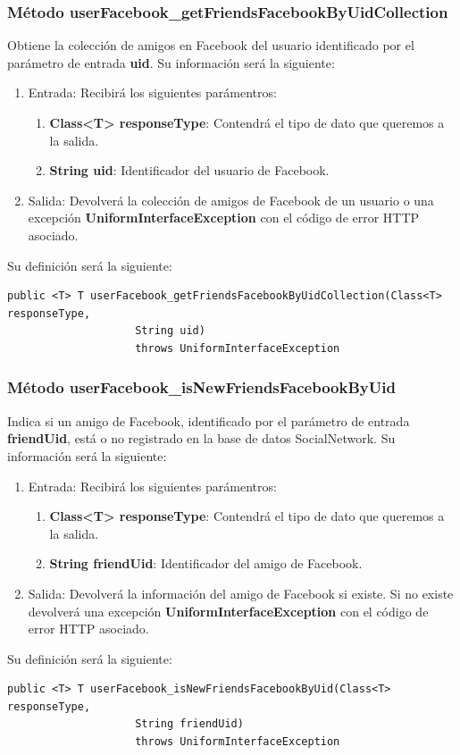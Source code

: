 \subsubsection{Método userFacebook\_getFriendsFacebookByUidCollection}
Obtiene la colección de amigos en Facebook del usuario identificado por el parámetro de entrada \textbf{uid}. Su información será la siguiente:
\begin{enumerate}
\item Entrada: Recibirá los siguientes parámentros:
\begin{enumerate}
\item \textbf{Class<T> responseType}: Contendrá el tipo de dato que queremos a la salida.
\item \textbf{String uid}: Identificador del usuario de Facebook.
\end{enumerate}
\item Salida: Devolverá la colección de amigos de Facebook de un usuario o una excepción \textbf{UniformInterfaceException} con el código de error HTTP asociado.
\end{enumerate}
\bigskip
\par
Su definición será la siguiente:
\begin{verbatim}public <T> T userFacebook_getFriendsFacebookByUidCollection(Class<T> responseType, 
					String uid) 
					throws UniformInterfaceException \end{verbatim}


\subsubsection{Método userFacebook\_isNewFriendsFacebookByUid}
Indica si un amigo de Facebook, identificado por el parámetro de entrada \textbf{friendUid}, está o no registrado en la base de datos SocialNetwork. Su información será la siguiente:
\begin{enumerate}
\item Entrada: Recibirá los siguientes parámentros:
\begin{enumerate}
\item \textbf{Class<T> responseType}: Contendrá el tipo de dato que queremos a la salida.
\item \textbf{String friendUid}: Identificador del amigo de Facebook.
\end{enumerate}
\item Salida: Devolverá la información del amigo de Facebook si existe. Si no existe devolverá una excepción \textbf{UniformInterfaceException} con el código de error HTTP asociado.
\end{enumerate}
\bigskip
\par
Su definición será la siguiente:
\begin{verbatim}public <T> T userFacebook_isNewFriendsFacebookByUid(Class<T> responseType, 
					String friendUid) 
					throws UniformInterfaceException \end{verbatim}


